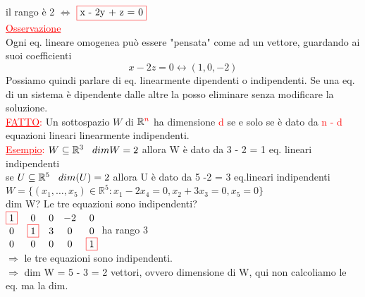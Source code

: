 \textsf{\small il rango è 2 $\Leftrightarrow$ $\textcolor{red}{\boxed{$\normalcolor x - 2y + z = 0$}}$}\\

\textcolor{red}{\underline{Osservazione}}\\
\textsf{\small Ogni eq. lineare omogenea può essere "pensata" come ad un vettore, guardando ai suoi coefficienti}
\[
x - 2z = 0 \leftrightarrow (1,0,-2)
\]
\textsf{\small Possiamo quindi parlare di eq. linearmente dipendenti o indipendenti. Se una eq. di un sistema è dipendente dalle altre la posso eliminare senza modificare la soluzione.}\\
\textcolor{red}{\underline{FATTO}:} \textsf{\small Un sottospazio $W$ di $\mathbb{R}^{\textcolor{red}{n}}$ ha dimensione \textcolor{red}{d} se e solo se è dato da \textcolor{red}{n - d} equazioni lineari linearmente indipendenti.}\\
\textcolor{red}{\underline{Esempio}:} $W \subseteq \mathbb{R}^3 \hspace{0.3cm} dim W = 2$ allora W è dato da 3 - 2 = 1 eq. lineari indipendenti\\
\textsf{\small se $U \subseteq \mathbb{R}^5 \hspace{0.3cm} dim(U) = 2$ allora U è dato da 5 -2 = 3 eq.lineari indipendenti}\\
$W = \{ (x_1, \dots, x_5) \in \mathbb{R}^5 : x_1 - 2x_4 = 0, x_2 + 3x_3 = 0, x_5 = 0\}$\\
\textsf{\small dim W? Le tre equazioni sono indipendenti?}\\

\(
\begin{matrix*}
	\color{red}\boxed{\normalcolor 1} \normalcolor& 0 & 0 & -2 & 0 \\
	0 & \color{red}\boxed{\normalcolor 1} \normalcolor& 3 & 0 & 0 \\
	0 & 0 & 0 & 0 & \color{red}\boxed{\normalcolor 1} \normalcolor\\
\end{matrix*}
\)
\textsf{\small ha rango 3}\\
$\Rightarrow$ \textsf{\small le tre equazioni sono indipendenti.}\\
$\Rightarrow$ \textsf{\small dim W = 5 - 3 = 2} \textsf{\small vettori, ovvero dimensione di W, qui non calcoliamo le eq. ma la dim.}

